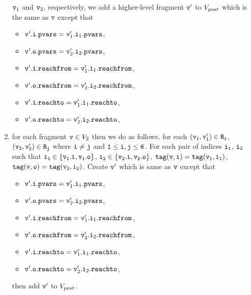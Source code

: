 \begin{enumerate}
     $\mathtt{v}_1$ and $\mathtt{v}_2$, respectively, we add a higher-level
     fragment $\mathtt{v}'$ to $V_{post}$
     which is the same as $\mathtt{v}$ except that 
\begin{itemize}
\item $\mathtt{v}'.\mathtt{i}.\mathtt{pvars} = \mathtt{v}_1'.\mathtt{i}_1.\mathtt{pvars}$,
\item $\mathtt{v}'.\mathtt{o}.\mathtt{pvars} = \mathtt{v}_2'.\mathtt{i}_2.\mathtt{pvars}$,
\item $\mathtt{v}'.\mathtt{i}.\mathtt{reachfrom} = \mathtt{v}_1'.\mathtt{i}_1.\mathtt{reachfrom}$,
\item $\mathtt{v}'.\mathtt{o}.\mathtt{reachfrom} = \mathtt{v}_2'.\mathtt{i}_2.\mathtt{reachfrom}$,
\item $\mathtt{v}'.\mathtt{i}.\mathtt{reachto} = \mathtt{v}_1'.\mathtt{i}_1.\mathtt{reachto}$,
\item $\mathtt{v}'.\mathtt{o}.\mathtt{reachto} =  \mathtt{v}_2'.\mathtt{i}_2.\mathtt{reachto}$,
\end{itemize}
\item for each fragment $\mathtt{v} \in V_2$ then we do as follows. for each $\tt (\mathtt{v}_1,\mathtt{v}_1') \in R_i$, $\tt (\mathtt{v}_2,\mathtt{v}_2') \in R_j$ where $\tt i \neq j$ and $\tt 1 \leq i,j \leq 6$. For each pair of indices $\tt i_1$, $\tt i_2$ such that $\tt i_1 \in \{\mathtt{v}_1.i, \mathtt{v}_1.o\}$, $\tt i_2 \in \{\mathtt{v}_2.i, \mathtt{v}_2.o\}$, $\tt tag(\mathtt{v},i) = tag(\mathtt{v}_1, i_1)$, $\tt tag(\mathtt{v},o) = tag(\mathtt{v}_2, i_2)$. Create $\mathtt{v}'$ which is same as $\mathtt{v}$ except that 
\begin{itemize}
\item $\mathtt{v}'.\mathtt{i}.\mathtt{pvars} = \mathtt{v}_1'.\mathtt{i}_1.\mathtt{pvars}$,
\item $\mathtt{v}'.\mathtt{o}.\mathtt{pvars} = \mathtt{v}_2'.\mathtt{i}_2.\mathtt{pvars}$,
\item $\mathtt{v}'.\mathtt{i}.\mathtt{reachfrom} = \mathtt{v}_1'.\mathtt{i}_1.\mathtt{reachfrom}$,
\item $\mathtt{v}'.\mathtt{o}.\mathtt{reachfrom} = \mathtt{v}_2'.\mathtt{i}_2.\mathtt{reachfrom}$,
\item $\mathtt{v}'.\mathtt{i}.\mathtt{reachto} = \mathtt{v}_1'.\mathtt{i}_1.\mathtt{reachto}$,
\item $\mathtt{v}'.\mathtt{o}.\mathtt{reachto} =  \mathtt{v}_2'.\mathtt{i}_2.\mathtt{reachto}$,
\end{itemize}
then add $\mathtt{v}'$ to $V_{post}$. 
\end{enumerate}
 
